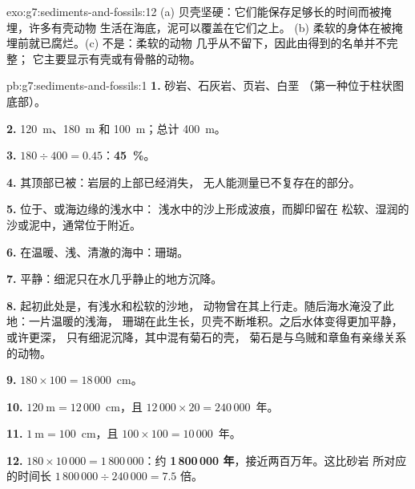 \begin{solution}{exo:g7:sediments-and-fossils:12}
(a) 贝壳坚硬：它们能保存足够长的时间而被掩埋，许多有壳动物
生活在海底，泥可以覆盖在它们之上。
(b) 柔软的身体在被掩埋前就已腐烂。(c) 不是：柔软的动物
几乎从不留下，因此由得到的名单并不完整；
它主要显示有壳或有骨骼的动物。
\end{solution}

\begin{solution}{pb:g7:sediments-and-fossils:1}
\textbf{1.} 砂岩、石灰岩、页岩、白垩
（第一种位于柱状图底部）。

\textbf{2.} \qty{120}{m}、\qty{180}{m} 和 \qty{100}{m}；总计
\qty{400}{m}。

\textbf{3.} $180 \div 400 = 0.45$：\textbf{45~\%}。

\textbf{4.} 其顶部已被：岩层的上部已经消失，
无人能测量已不复存在的部分。

\textbf{5.} 位于、或海边缘的浅水中：
浅水中的沙上形成波痕，而脚印留在
松软、湿润的沙或泥中，通常位于附近。

\textbf{6.} 在温暖、浅、清澈的海中：珊瑚。

\textbf{7.} 平静：细泥只在水几乎静止的地方沉降。

\textbf{8.} 起初此处是，有浅水和松软的沙地，
动物曾在其上行走。随后海水淹没了此地：一片温暖的浅海，
珊瑚在此生长，贝壳不断堆积。之后水体变得更加平静，或许更深，
只有细泥沉降，其中混有菊石的壳，
菊石是与乌贼和章鱼有亲缘关系的动物。

\textbf{9.} $180 \times 100 = 18\,000$~cm。

\textbf{10.} $120~\text{m} = 12\,000$~cm，且 $12\,000 \times 20 =
240\,000$~年。

\textbf{11.} $1~\text{m} = 100$~cm，且 $100 \times 100 = 10\,000$~年。

\textbf{12.} $180 \times 10\,000 = 1\,800\,000$：约
\textbf{1\,800\,000 年}，接近两百万年。这比砂岩
所对应的时间长 $1\,800\,000 \div 240\,000 = 7.5$ 倍。
\end{solution}
